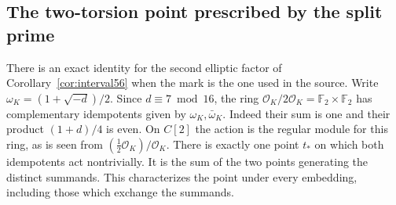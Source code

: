 \documentclass[a4paper,11pt]{article}
\theoremstyle{definition}
\theoremstyle{remark}
\numberwithin{equation}{section}
\begin{document}
\subsection{The two-torsion point prescribed by the split prime}\label{nav:V-21}
There is an exact identity for the second elliptic factor of
Corollary~\ref{cor:interval56} when the mark is the one used in
the source. Write \(\omega_K=(1+\sqrt{-d})/2\). Since
\(d\equiv7\bmod16\), the ring
\(\mathcal O_K/2\mathcal O_K=\mathbb F_2\times\mathbb F_2\)
has complementary idempotents given by \(\omega_K,\bar\omega_K\).
Indeed their sum is one and their product \((1+d)/4\) is even.
On \(C[2]\) the action is the regular module for this ring, as
is seen from \((\tfrac12\mathcal O_K)/\mathcal O_K\).
There is exactly one point \(t_*\) on which both idempotents act
nontrivially. It is the sum of the two points generating the
distinct summands. This characterizes the point under every
embedding, including those which exchange the summands.
\end{document}

